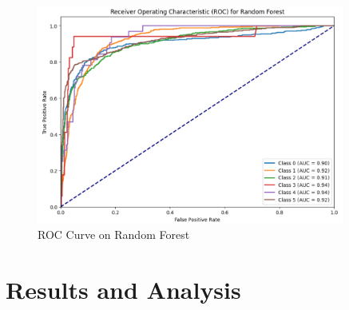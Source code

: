 \begin{figure}[h!]  
    \centering
    \includegraphics[width=0.9\textwidth]{Images/ROC RF.png}  
    \caption{ROC Curve on Random Forest}
    \label{ROC RF}  %
\end{figure}






\pagebreak

\section{Results and Analysis}




